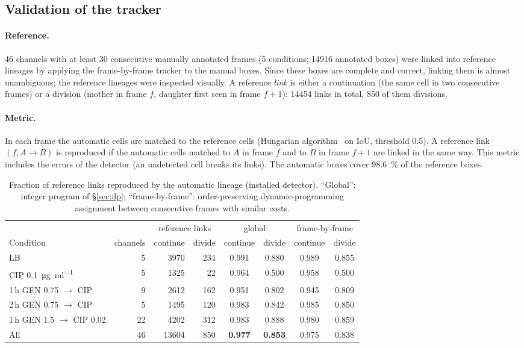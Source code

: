 \documentclass[11pt,a4paper]{article}
\begin{document}
\subsection{Validation of the tracker}\label{sec:trk_eval}
\paragraph{Reference.} 46 channels with at least 30 consecutive manually annotated frames (5 conditions; \num{14916} annotated boxes) were linked into reference lineages by applying the frame-by-frame tracker to the manual boxes. Since these boxes are complete and correct, linking them is almost unambiguous; the reference lineages were inspected visually. A reference \emph{link} is either a continuation (the same cell in two consecutive frames) or a division (mother in frame $f$, daughter first seen in frame $f+1$): \num{14454} links in total, 850 of them divisions.

\paragraph{Metric.} In each frame the automatic cells are matched to the reference cells (Hungarian algorithm~\cite{kuhn1955} on IoU, threshold 0.5). A reference link $(f,A\to B)$ is reproduced if the automatic cells matched to $A$ in frame $f$ and to $B$ in frame $f+1$ are linked in the same way. This metric includes the errors of the detector (an undetected cell breaks its links). The automatic boxes cover \SI{98.6}{\percent} of the reference boxes.

\begin{table}[ht]
\centering\small
\caption{Fraction of reference links reproduced by the automatic lineage (installed detector). ``Global'': integer program of \S\ref{sec:ilp}; ``frame-by-frame'': order-preserving dynamic-programming assignment between consecutive frames with similar costs.}
\label{tab:trk}
\begin{tabular}{@{}lrrrcccc@{}}
\toprule
 & & \multicolumn{2}{c}{reference links} & \multicolumn{2}{c}{global} & \multicolumn{2}{c}{frame-by-frame}\\
\cmidrule(lr){3-4}\cmidrule(lr){5-6}\cmidrule(l){7-8}
Condition & channels & continue & divide & continue & divide & continue & divide\\
\midrule
LB & 5 & 3970 & 234 & 0.991 & 0.880 & 0.989 & 0.855\\
CIP \SI{0.1}{\micro\gram\per\milli\litre} & 5 & 1325 & 22 & 0.964 & 0.500 & 0.958 & 0.500\\
1\,h GEN 0.75 $\to$ CIP & 9 & 2612 & 162 & 0.951 & 0.802 & 0.945 & 0.809\\
2\,h GEN 0.75 $\to$ CIP & 5 & 1495 & 120 & 0.983 & 0.842 & 0.985 & 0.850\\
1\,h GEN 1.5 $\to$ CIP 0.02 & 22 & 4202 & 312 & 0.983 & 0.888 & 0.980 & 0.859\\
\midrule
All & 46 & 13604 & 850 & \textbf{0.977} & \textbf{0.853} & 0.975 & 0.838\\
\bottomrule
\end{tabular}
\end{table}
\end{document}
